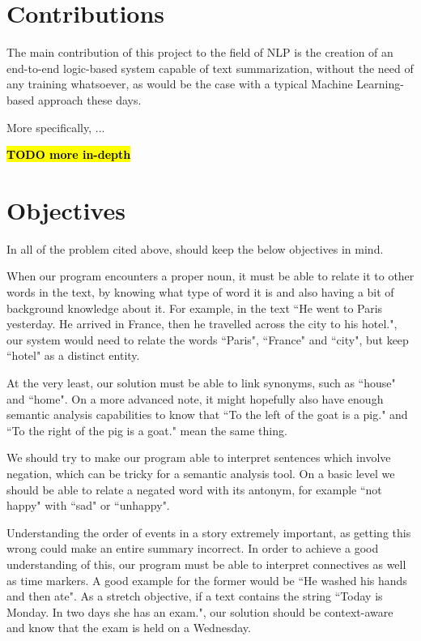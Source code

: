 \section{Contributions}

The main contribution of this project to the field of NLP is the creation of an end-to-end logic-based system capable of text summarization, without the need of any training whatsoever, as would be the case with a typical Machine Learning-based approach these days.

More specifically, ...

\textcolor{red}{\textbf{\hl{TODO more in-depth}}}

\newpage

\section{Objectives}

In all of the problem cited above, should keep the below objectives in mind.

\begin{objective}
When our program encounters a proper noun, it must be able to relate it to other words in the text, by knowing what type of word it is and also having a bit of background knowledge about it. For example, in the text ``He went to Paris yesterday. He arrived in France, then he travelled across the city to his hotel.", our system would need to relate the words ``Paris", ``France" and ``city", but keep ``hotel" as a distinct entity.
\end{objective}

\begin{objective}[Periphrasis]
At the very least, our solution must be able to link synonyms, such as ``house" and ``home". On a more advanced note, it might hopefully also have enough semantic analysis capabilities to know that ``To the left of the goat is a pig." and ``To the right of the pig is a goat." mean the same thing.
\end{objective}

\begin{objective}[Negation]
We should try to make our program able to interpret sentences which involve negation, which can be tricky for a semantic analysis tool. On a basic level we should be able to relate a negated word with its antonym, for example ``not happy" with ``sad" or ``unhappy".
\end{objective}

\begin{objective}
Understanding the order of events in a story extremely important, as getting this wrong could make an entire summary incorrect. In order to achieve a good understanding of this, our program must be able to interpret connectives as well as time markers. A good example for the former would be ``He washed his hands and then ate". As a stretch objective, if a text contains the string ``Today is Monday. In two days she has an exam.", our solution should be context-aware and know that the exam is held on a Wednesday.
\end{objective}

